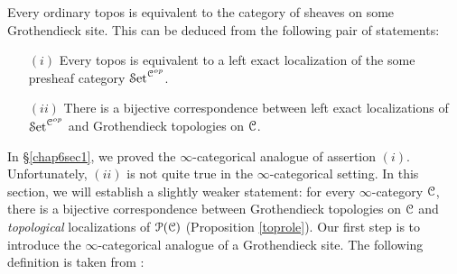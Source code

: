 Every ordinary topos is equivalent to the category of sheaves on some Grothendieck site. This can be deduced from the following pair of statements:
\begin{itemize}
\item[$(i)$] Every topos is equivalent to a left exact localization of the some presheaf category
$\operatorname{\mathcal{S}et}^{\operatorname{\mathcal{C}}^{op}}$.
\item[$(ii)$] There is a bijective correspondence between left exact localizations of
$\operatorname{\mathcal{S}et}^{\operatorname{\mathcal{C}}^{op}}$ and Grothendieck topologies on $\operatorname{\mathcal{C}}$.
\end{itemize}
In \S \ref{chap6sec1}, we proved the $\infty$-categorical analogue of assertion $(i)$. Unfortunately, $(ii)$ is not quite true in the $\infty$-categorical setting. In this section, we will establish a slightly weaker statement: for every $\infty$-category $\operatorname{\mathcal{C}}$, there is a bijective correspondence between Grothendieck topologies on $\operatorname{\mathcal{C}}$ and {\em topological} localizations of $\operatorname{\mathcal{P}}(\operatorname{\mathcal{C}})$ (Proposition \ref{toprole}).
Our first step is to introduce the $\infty$-categorical analogue of a Grothendieck site. The following definition is taken from \cite{toen}:

